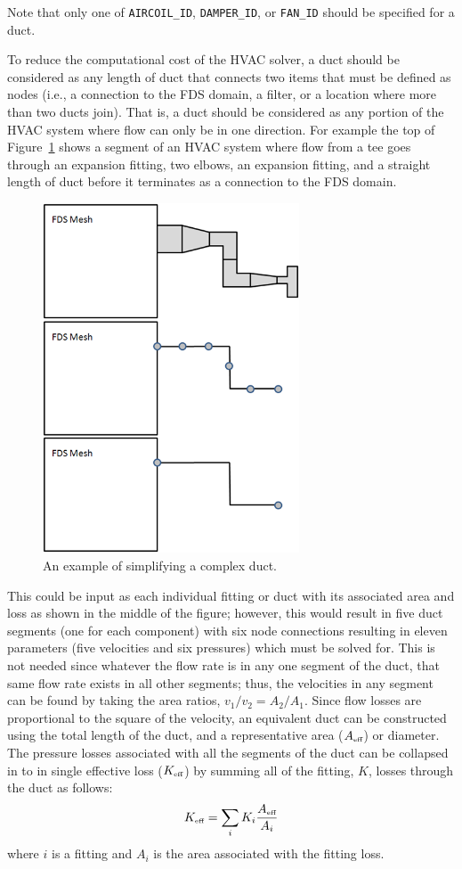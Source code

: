 \documentclass[11pt]{book}
\newcommand{\ct}{\tt\small}
\newcommand{\be}{\begin{equation}}
\newcommand{\ee}{\end{equation}}
\begin{document}
\noindent
Note that only one of {\ct AIRCOIL\_ID}, {\ct DAMPER\_ID}, or {\ct FAN\_ID} should be specified for a duct.

To reduce the computational cost of the HVAC solver, a duct should be considered as any length of duct that connects two items that must be defined as nodes (i.e., a connection to the FDS domain, a filter, or a location where more than two ducts join).  That is, a duct should be considered as any portion of the HVAC system where flow can only be in one direction.  For example the top of Figure~\ref{fig:HVAC_Simplify} shows a segment of an HVAC system where flow from a tee goes through an expansion fitting, two elbows, an expansion fitting, and a straight length of duct before it terminates as a connection to the FDS domain.
\begin{figure}[ht]
\begin{center}
\includegraphics[width=3in]{FIGURES/hvac-simplify}
\end{center}
\caption[An example of simplifying a complex duct]{An example of simplifying a complex duct.}
\label{fig:HVAC_Simplify}
\end{figure}
This could be input as each individual fitting or duct with its associated area and loss as shown in the middle of the figure; however, this would result in five duct segments (one for each component) with six node connections resulting in eleven parameters (five velocities and six pressures) which must be solved for.  This is not needed since whatever the flow rate is in any one segment of the duct, that same flow rate exists in all other segments; thus, the velocities in any segment can be found by taking the area ratios, $v_1/v_2=A_2/A_1$.  Since flow losses are proportional to the square of the velocity, an equivalent duct can be constructed using the total length of the duct, and a representative area ($A_{\mbox{\tiny eff}}$) or diameter.  The pressure losses associated with all the segments of the duct can be collapsed in to in single effective loss ($K_{\mbox{\tiny eff}}$) by summing all of the fitting, $K$, losses through the duct as follows:
\be K_{\mbox{\tiny eff}} = \sum_i {K_i \frac {A_{\mbox{\tiny eff}}}{A_i}} \ee
where $i$ is a fitting and $A_i$ is the area associated with the fitting loss.
\end{document}
